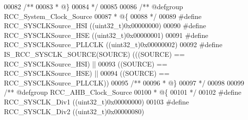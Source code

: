 \begin{DoxyCode}
00082 \textcolor{comment}{/**}
00083 \textcolor{comment}{  * @\}}
00084 \textcolor{comment}{  */}
00085 
00086 \textcolor{comment}{/** @defgroup RCC\_System\_Clock\_Source }
00087 \textcolor{comment}{  * @\{}
00088 \textcolor{comment}{  */}
00089 \textcolor{preprocessor}{#}\textcolor{preprocessor}{define} \textcolor{preprocessor}{RCC\_SYSCLKSource\_HSI}             \textcolor{preprocessor}{(}\textcolor{preprocessor}{(}\textcolor{preprocessor}{uint32\_t}\textcolor{preprocessor}{)}0x00000000\textcolor{preprocessor}{)}
00090 \textcolor{preprocessor}{#}\textcolor{preprocessor}{define} \textcolor{preprocessor}{RCC\_SYSCLKSource\_HSE}             \textcolor{preprocessor}{(}\textcolor{preprocessor}{(}\textcolor{preprocessor}{uint32\_t}\textcolor{preprocessor}{)}0x00000001\textcolor{preprocessor}{)}
00091 \textcolor{preprocessor}{#}\textcolor{preprocessor}{define} \textcolor{preprocessor}{RCC\_SYSCLKSource\_PLLCLK}          \textcolor{preprocessor}{(}\textcolor{preprocessor}{(}\textcolor{preprocessor}{uint32\_t}\textcolor{preprocessor}{)}0x00000002\textcolor{preprocessor}{)}
00092 \textcolor{preprocessor}{#}\textcolor{preprocessor}{define} \textcolor{preprocessor}{IS\_RCC\_SYSCLK\_SOURCE}\textcolor{preprocessor}{(}\textcolor{preprocessor}{SOURCE}\textcolor{preprocessor}{)} \textcolor{preprocessor}{(}\textcolor{preprocessor}{(}\textcolor{preprocessor}{(}\textcolor{preprocessor}{SOURCE}\textcolor{preprocessor}{)} \textcolor{preprocessor}{==} RCC_SYSCLKSource_HSI\textcolor{preprocessor}{)} \textcolor{preprocessor}{||}
00093                                       \textcolor{preprocessor}{(}\textcolor{preprocessor}{(}\textcolor{preprocessor}{SOURCE}\textcolor{preprocessor}{)} \textcolor{preprocessor}{==} RCC_SYSCLKSource_HSE\textcolor{preprocessor}{)} \textcolor{preprocessor}{||}
00094                                       \textcolor{preprocessor}{(}\textcolor{preprocessor}{(}\textcolor{preprocessor}{SOURCE}\textcolor{preprocessor}{)} \textcolor{preprocessor}{==} RCC_SYSCLKSource_PLLCLK\textcolor{preprocessor}{)}\textcolor{preprocessor}{)}
00095 \textcolor{comment}{/**}
00096 \textcolor{comment}{  * @\}}
00097 \textcolor{comment}{  */}
00098 
00099 \textcolor{comment}{/** @defgroup RCC\_AHB\_Clock\_Source}
00100 \textcolor{comment}{  * @\{}
00101 \textcolor{comment}{  */}
00102 \textcolor{preprocessor}{#}\textcolor{preprocessor}{define} \textcolor{preprocessor}{RCC\_SYSCLK\_Div1}                  \textcolor{preprocessor}{(}\textcolor{preprocessor}{(}\textcolor{preprocessor}{uint32\_t}\textcolor{preprocessor}{)}0x00000000\textcolor{preprocessor}{)}
00103 \textcolor{preprocessor}{#}\textcolor{preprocessor}{define} \textcolor{preprocessor}{RCC\_SYSCLK\_Div2}                  \textcolor{preprocessor}{(}\textcolor{preprocessor}{(}\textcolor{preprocessor}{uint32\_t}\textcolor{preprocessor}{)}0x00000080\textcolor{preprocessor}{)}

\end{DoxyCode}
